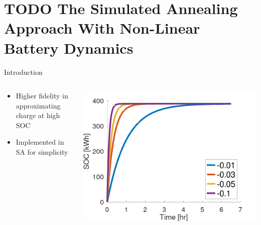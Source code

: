 \documentclass[aspectratio=169]{beamer}
\begin{document}
\section{{\bfseries\sffamily TODO} The Simulated Annealing Approach With Non-Linear Battery Dynamics}
\label{sec:orgd4dccda}

\begin{frame}[label={sec:org7bd1feb}]{Introduction}
\begin{columns}
\begin{column}{0.3\columnwidth}
\begin{itemize}
\item Higher fidelity in approximating charge at high SOC
\item Implemented in SA for simplicity
\end{itemize}
\end{column}

\begin{column}{0.7\columnwidth}
\begin{center}
\includegraphics[width=.9\linewidth]{./img/nonlinear-bat.png}
\end{center}
\end{column}
\end{columns}
\end{frame}
\end{document}
